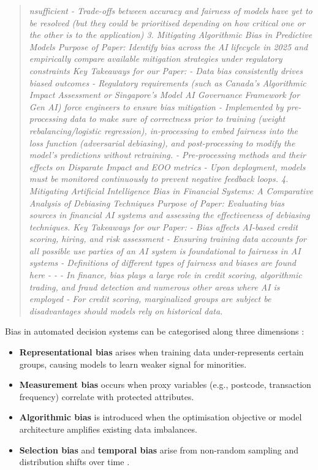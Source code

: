 \documentclass[conference]{IEEEtran}
\begin{document}
\begin{quote}
\textit{nsufficient - Trade-offs between accuracy and fairness of models have yet to be resolved (but they could be prioritised depending on how critical one or the other is to the application) 3. Mitigating Algorithmic Bias in Predictive Models Purpose of Paper: Identify bias across the AI lifecycle in 2025 and empirically compare available mitigation strategies under regulatory constraints Key Takeaways for our Paper: - Data bias consistently drives biased outcomes - Regulatory requirements (such as Canada’s Algorithmic Impact Assessment or Singapore’s Model AI Governance Framework for Gen AI) force engineers to ensure bias mitigation - Implemented by pre-processing data to make sure of correctness prior to training (weight rebalancing/logistic regression), in-processing to embed fairness into the loss function (adversarial debiasing), and post-processing to modify the model’s predictions without retraining. - Pre-processing methods and their effects on Disparate Impact and EOO metrics - Upon deployment, models must be monitored continuously to prevent negative feedback loops. 4. Mitigating Artificial Intelligence Bias in Financial Systems: A Comparative Analysis of Debiasing Techniques Purpose of Paper: Evaluating bias sources in financial AI systems and assessing the effectiveness of debiasing techniques. Key Takeaways for our Paper: - Bias affects AI-based credit scoring, hiring, and risk assessment - Ensuring training data accounts for all possible use parties of an AI system is foundational to fairness in AI systems - Definitions of different types of fairness and biases are found here - - - In finance, bias plays a large role in credit scoring, algorithmic trading, and fraud detection and numerous other areas where AI is employed - For credit scoring, marginalized groups are subject be disadvantages should models rely on historical data.}
\end{quote}

Bias in automated decision systems can be categorised along three dimensions \cite{ntoutsi2020}:

\begin{itemize}
\item \textbf{Representational bias} arises when training data under-represents
  certain groups, causing models to learn weaker signal for minorities.
\item \textbf{Measurement bias} occurs when proxy variables (e.g., postcode,
  transaction frequency) correlate with protected attributes.
\item \textbf{Algorithmic bias} is introduced when the optimisation objective or
  model architecture amplifies existing data imbalances.
\item \textbf{Selection bias} and \textbf{temporal bias} arise from non-random sampling
  and distribution shifts over time \cite{chen2023,pagano2023}.
\end{itemize}
\end{document}
